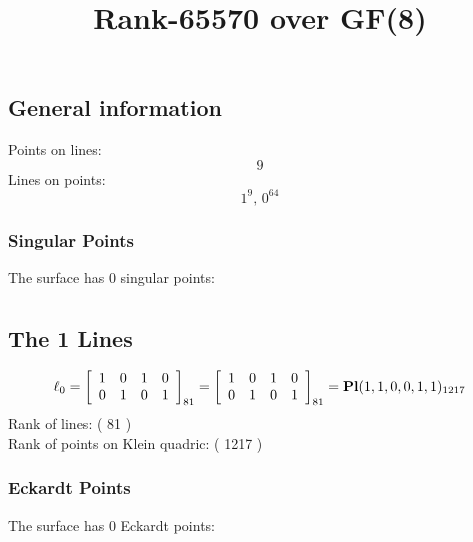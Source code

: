 \documentclass{article}
\newcommand\setTBstruts{\def\T{\rule{0pt}{2.6ex}}%
\def\B{\rule[-1.2ex]{0pt}{0pt}}}
\begin{document}
 
\setTBstruts



{\allowdisplaybreaks%






\title{Rank-65570 over GF(8)}
\author{}%
\maketitle%
%
{}



\subsection*{General information}
Points on lines:
$$
9$$
Lines on points:
$$
1^9,\,0^{64}$$
\subsubsection*{Singular Points}
The surface has 0 singular points:\\
\begin{align*}
\end{align*}
\subsection*{The 1 Lines}
$$
\ell_{0} = 
\left[
\begin{array}{*{4}{r}}
1 & 0 & 1 & 0\\
0 & 1 & 0 & 1\\
\end{array}
\right]
_{81}
=
\left[
\begin{array}{*{4}c}
1  & 0  & 1  & 0\\
0  & 1  & 0  & 1\\
\end{array}
\right]_{81}
={\rm\bf Pl}(1,1,0,0,1,1 )_{1217}$$
Rank of lines: ( 81 )\\
Rank of points on Klein quadric: ( 1217 )\\
\subsubsection*{Eckardt Points}
The surface has 0 Eckardt points:\\
}
\end{document}
